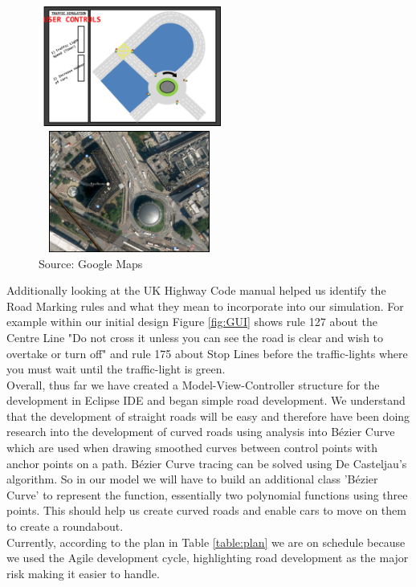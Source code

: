 \documentclass[a4paper,11pt]{article}
\begin{document}
\begin{figure}[ht]%
\centering
\begin{minipage}[b]{0.45\linewidth}
		\includegraphics[width=6cm,height=4cm]{UserControls.png} 
	\caption*{ }
	\label{fig:GUI}
\end{minipage}
\begin{minipage}[b]{0.45\linewidth}
	\includegraphics[width=6cm, height=4cm]{WATERLOO.png} 	
	\caption*{Source: Google Maps}
	\label{fig:Waterloo}
\end{minipage}

\end{figure}

Additionally looking at the UK Highway Code manual helped us identify the Road Marking rules and what they mean to  incorporate into our simulation. For example within our initial design Figure \ref{fig:GUI} shows rule 127 about the Centre Line "Do not cross it unless you can see the road is clear and wish to overtake or turn off" and rule 175 about Stop Lines before the traffic-lights where you must wait until the traffic-light is green.\\Overall, thus far we have created a Model-View-Controller structure for the development in Eclipse IDE and began simple road development. We understand that the development of straight roads will be easy and therefore have been doing research into the development of curved roads using analysis into B\'{e}zier Curve which are used when drawing smoothed curves between control points with anchor points on a path. B\'{e}zier Curve tracing can be solved using De Casteljau's algorithm. So in our model we will have to build an additional class 'B\'{e}zier Curve' to represent the function, essentially two polynomial functions using three points. This should help us create curved roads and enable cars to move on them to create a roundabout.\\Currently, according to the plan in Table \ref{table:plan} we are on schedule because we used the Agile development cycle, highlighting road development as the major risk making it easier to handle.
\end{document}
